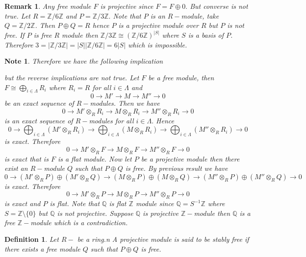 \documentclass[11pt]{amsart}
\newtheorem{defn}[theorem]{Definition}
\newtheorem{note}[theorem]{Note}
\newtheorem{remark}[theorem]{Remark}%
\newcommand{\QQ}{\mathbb Q}
\newcommand{\ZZ}{\mathbb Z}
\begin{document}
\begin{remark}
Any free module $F$ is projective since $F=F\oplus 0.$ But converse is not true. Let $R={\ZZ}/6{\ZZ}$ and $P={\ZZ}/3{\ZZ}.$ Note that $P$ is an $R-$module, take $Q={\ZZ}/2{\ZZ}$. Then $P\oplus Q=R$ hence $P$ is a projective module over $R$ but $P$ is not free. If $P$ is free $R$ module then ${\ZZ}/3{\ZZ}\cong ({\ZZ}/6{\ZZ})^{|S|}$ where $S$ is a basis of $P$. Therefore $3=|{\ZZ}/3{\ZZ}|=|S||{\ZZ}/6{\ZZ}|=6|S|$ which is impossible.
\end{remark}

\begin{note}
Therefore we have the following implication 
\begin{center}
\end{center}
but the reverse implications are not true. Let $F$ be a free module, then $F\cong \displaystyle\bigoplus_{i\in\Lambda} R_i$ where $R_i=R$ for all $i\in\Lambda$ and \begin{equation}
0\to M'\to M\to M''\to 0
\end{equation}
be an exact sequence of $R-$modules. Then we have $$0\to M'\otimes_R R_i\to M\otimes_R R_i\to M''\otimes_R R_i\to 0$$ is an exact sequence of $R-$modules for all $i\in\Lambda.$ Hence $$0\to \bigoplus_{i\in\Lambda} (M'\otimes_R R_i)\to \bigoplus_{i\in\Lambda} (M\otimes_R R_i)\to \bigoplus_{i\in\Lambda} (M''\otimes_R R_i)\to 0$$ is exact. Therefore $$0\to M'\otimes_R F\to M\otimes_R F\to M''\otimes_R F\to 0$$ is exact that is $F$ is a flat module. Now let $P$ be a projective module then there exist an $R-$module $Q$ such that $P\oplus Q$ is free. By previous result we have $$0\to (M'\otimes_R P)\oplus (M'\otimes_R Q)\to (M\otimes_R P)\oplus (M\otimes_R Q)\to (M''\otimes_R P)\oplus (M''\otimes_R Q)\to 0$$ is exact. Therefore $$0\to M'\otimes_R P\to M\otimes_R P\to M''\otimes_R P\to 0$$ is exact and $P$ is flat. Note that ${\QQ}$ is flat ${\ZZ}$ module since ${\QQ}=S^{-1}{\ZZ}$ where $S={\ZZ}\setminus\{0\}$ but ${\QQ}$ is not projective. Suppose ${\QQ}$ is projective ${\ZZ}-$module then ${\QQ}$ is a free ${\ZZ}-$module which is a contradiction.

\end{note}

\begin{defn}

Let $R-$ be a ring.n A projective module is said to be stably free if there exists a free module $Q$ such that $P\oplus Q$ is free.

\end{defn}
\end{document}
